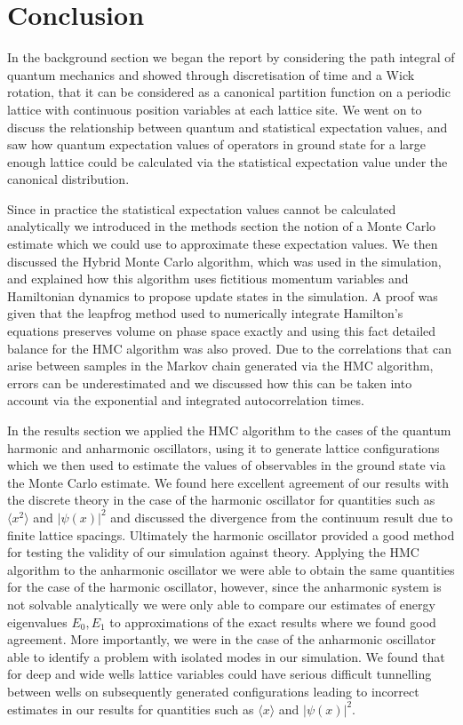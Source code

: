 \documentclass[12pt]{article}
\begin{document}
\section{Conclusion}
    In the background section we began the report by considering the path integral of quantum mechanics and showed through discretisation of time and a Wick rotation, that it can be considered as a canonical partition function on a periodic lattice with continuous position variables at each lattice site. We went on to discuss the relationship between quantum and statistical expectation values, and saw how quantum expectation values of operators in ground state for a large enough lattice could be calculated via the statistical expectation value under the canonical distribution. 

    Since in practice the statistical expectation values cannot be calculated analytically we introduced in the methods section the notion of a Monte Carlo estimate which we could use to approximate these expectation values. We then discussed the Hybrid Monte Carlo algorithm, which was used in the simulation, and explained how this algorithm uses fictitious momentum variables and Hamiltonian dynamics to propose update states in the simulation. A proof was given that the leapfrog method used to numerically integrate Hamilton's equations preserves volume on phase space exactly and using this fact detailed balance for the HMC algorithm was also proved. Due to the correlations that can arise between samples in the Markov chain generated via the HMC algorithm, errors can be underestimated and we discussed how this can be taken into account via the exponential and integrated autocorrelation times.

    In the results section we applied the HMC algorithm to the cases of the quantum harmonic and anharmonic oscillators, using it to generate lattice configurations which we then used to estimate the values of observables in the ground state via the Monte Carlo estimate. We found here excellent agreement of our results with the discrete theory in the case of the harmonic oscillator for quantities such as $\langle x^2 \rangle$ and $|\psi\left(x\right)|^2$ and discussed the divergence from the continuum result due to finite lattice spacings. Ultimately the harmonic oscillator provided a good method for testing the validity of our simulation against theory. Applying the HMC algorithm to the anharmonic oscillator we were able to obtain the same quantities for the case of the harmonic oscillator, however, since the anharmonic system is not solvable analytically we were only able to compare our estimates of energy eigenvalues $E_0, E_1$ to approximations of the exact results where we found good agreement. More importantly, we were in the case of the anharmonic oscillator able to identify a problem with isolated modes in our simulation. We found that for deep and wide wells lattice variables could have serious difficult tunnelling between wells on subsequently generated configurations leading to incorrect estimates in our results for quantities such as $\langle x \rangle$ and $|\psi\left(x\right)|^2$. 
\end{document}
